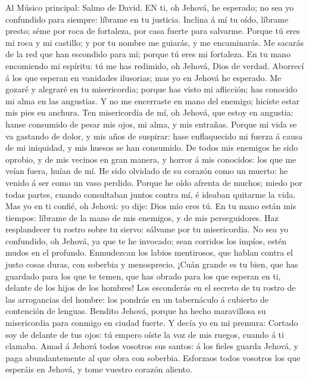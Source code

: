  Al Músico principal: Salmo de David. EN ti, oh Jehová, he
esperado; no sea yo confundido para siempre: líbrame en tu justicia.
 Inclina á mí tu oído, líbrame presto; séme por roca de
fortaleza, por casa fuerte para salvarme.  Porque tú eres mi
roca y mi castillo; y por tu nombre me guiarás, y me encaminarás.
 Me sacarás de la red que han escondido para mí; porque tú
eres mi fortaleza.  En tu mano encomiendo mi espíritu: tú me
has redimido, oh Jehová, Dios de verdad.  Aborrecí á los que
esperan en vanidades ilusorias; mas yo en Jehová he esperado.
 Me gozaré y alegraré en tu misericordia; porque has visto
mi aflicción; has conocido mi alma en las angustias.  Y no
me encerraste en mano del enemigo; hiciste estar mis pies en anchura.
 Ten misericordia de mí, oh Jehová, que estoy en angustia:
hanse consumido de pesar mis ojos, mi alma, y mis entrañas.
 Porque mi vida se va gastando de dolor, y mis años de
suspirar: hase enflaquecido mi fuerza á causa de mi iniquidad, y mis
huesos se han consumido.  De todos mis enemigos he sido
oprobio, y de mis vecinos en gran manera, y horror á mis conocidos: los
que me veían fuera, huían de mí.  He sido olvidado de su
corazón como un muerto: he venido á ser como un vaso perdido.
 Porque he oído afrenta de muchos; miedo por todas partes,
cuando consultaban juntos contra mí, é ideaban quitarme la vida.
 Mas yo en ti confié, oh Jehová: yo dije: Dios mío eres tú.
 En tu mano están mis tiempos: líbrame de la mano de mis
enemigos, y de mis perseguidores.  Haz resplandecer tu
rostro sobre tu siervo: sálvame por tu misericordia.  No
sea yo confundido, oh Jehová, ya que te he invocado; sean corridos los
impíos, estén mudos en el profundo.  Enmudezcan los labios
mentirosos, que hablan contra el justo cosas duras, con soberbia y
menosprecio.  ¡Cuán grande es tu bien, que has guardado
para los que te temen, que has obrado para los que esperan en ti,
delante de los hijos de los hombres!  Los esconderás en el
secreto de tu rostro de las arrogancias del hombre: los pondrás en un
tabernáculo á cubierto de contención de lenguas.  Bendito
Jehová, porque ha hecho maravillosa su misericordia para conmigo en
ciudad fuerte.  Y decía yo en mi premura: Cortado soy de
delante de tus ojos: tú empero oíste la voz de mis ruegos, cuando á ti
clamaba.  Amad á Jehová todos vosotros sus santos: á los
fieles guarda Jehová, y paga abundantemente al que obra con soberbia.
 Esforzaos todos vosotros los que esperáis en Jehová, y
tome vuestro corazón aliento.

